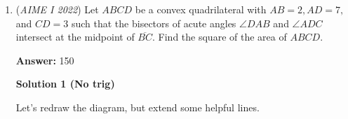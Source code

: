 \begin{enumerate}
 Hence,
 \begin{align*} O_B B - O_A A & = \sqrt{O_A O_B^2 - AB^2} \\ & = 4 . \hspace{1cm} (1) \end{align*}


 Recall that
 \begin{align*} O_B B^2 - O_A A^2 & = \left( 13^2 - r^2 \right) - \left( 11^2 - r^2 \right) \\ & = 48 . \hspace{1cm} (2) \end{align*}


 Hence, taking $\frac{(2)}{(1)}$, we get
 \[ O_B B + O_A A = 12 . \hspace{1cm} (3) \]

 Solving (1) and (3), we get $O_B B = 8$ and $O_A A = 4$.

 Thus, $r^2 = 11^2 - O_A A^2 = 105$.

 Thus, $O_C C = \sqrt{19^2 - r^2} = 16$.

 Because $O_A A$ and $O_C C$ are perpendicular to the plane, $O_A AC O_C$ is a right trapezoid, with $\angle O_A A C = \angle O_C CA = 90^\circ$.

 Therefore,
 \begin{align*} AC^2 & = O_A O_C^2 - \left( O_C C - O_A A \right)^2 \\ & = \boxed{756}. \end{align*}

$\textbf{FINAL NOTE:}$ In our solution, we do not use the condition that spheres $A$ and $B$ are externally tangent. This condition is redundant in solving this problem. 

 $\textbf{MORE FINAL NOTE:}$ the above note is incorrect because that condition was used at the start when claiming $O_AO_B=24$. Perhaps the note is referring to spheres $B$ and $C$.

 


	\item (\textit{AIME I 2022}) Let $ABCD$ be a convex quadrilateral with $AB=2, AD=7,$ and $CD=3$ such that the bisectors of acute angles $\angle{DAB}$ and $\angle{ADC}$ intersect at the midpoint of $\overline{BC}.$ Find the square of the area of $ABCD.$

 \textbf{Answer: }150



\textbf{Solution 1 (No trig)}

Let's redraw the diagram, but extend some helpful lines.


\end{enumerate}
